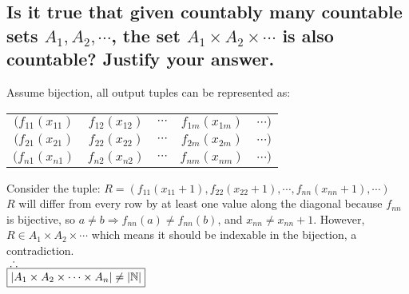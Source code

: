 \documentclass[letterpaper]{article}
\begin{document}
\subsection{Is it true that given countably many countable sets $A_1,A_2,\dotsb$, the set $A_1\times A_2\times\dotsb$ is also countable? Justify your answer.}
\begin{center}
Assume bijection, all output tuples can be represented as: \newline\newline
\begin{tabular}{c c c c c}
$(f_{11}(x_{11})$ & $f_{12}(x_{12})$ & $\dotsb$ & $f_{1m}(x_{1m})$ & $\dotsb)$ \\
$(f_{21}(x_{21})$ & $f_{22}(x_{22})$ & $\dotsb$ & $f_{2m}(x_{2m})$ & $\dotsb)$ \\
$(f_{n1}(x_{n1})$ & $f_{n2}(x_{n2})$ & $\dotsb$ & $f_{nm}(x_{nm})$ & $\dotsb)$
\end{tabular} \newline\newline
Consider the tuple: $R=(f_{11}(x_{11}+1),f_{22}(x_{22}+1),\dotsb,f_{nn}(x_{nn}+1),\dotsb)$ \\
$R$ will differ from every row by at least one value along the diagonal because $f_{nn}$ is bijective, so $a\neq b\Rightarrow f_{nn}(a)\neq f_{nn}(b)$, and $x_{nn}\neq x_{nn}+1$. However, $R\in A_1\times A_2\times\dotsb$ which means it should be indexable in the bijection, a contradiction. \\
$\newline\therefore$ \\
$\newline\boxed{|A_1\times A_2\times\dotsb\times A_n|\neq|\mathbb{N}|}$
\end{center}

\section{}
\end{document}
